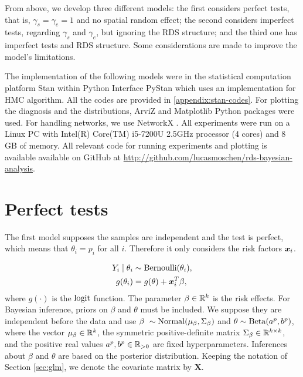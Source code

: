 From above, we develop three different models: the first considers perfect
tests, that is, $\gamma_s = \gamma_e = 1$ and no spatial random effect;
the second considers imperfect tests, regarding $\gamma_s$ and $\gamma_e$,
but ignoring the RDS structure; and the third one has imperfect tests and
RDS structure. Some considerations are made to improve the model's
  limitations.

The implementation of the following models were in the statistical computation
platform Stan \cite{carpenter2017stan} within Python Interface PyStan
\cite{pystan} which uses an implementation for HMC algorithm. All the codes
are provided in \autoref{appendix:stan-codes}. For plotting the diagnosis and
the distributions, ArviZ \cite{arviz_2019} and Matplotlib \cite{Hunter_2007}
Python packages were used. For handling networks, we use NetworkX
\cite{hagberg2008exploring}. All experiments were run on a Linux
PC with Intel(R) Core(TM) i5-7200U 2.5GHz processor (4 cores) and 8 GB of
memory. All relevant code for running experiments and plotting is available
available on GitHub at \url{http://github.com/lucasmoschen/rds-bayesian-analysis}.

\section{Perfect tests}

The first model supposes the samples are independent and the test is perfect,
which means that $\theta_i = p_i$ for all $i$. Therefore it only considers the risk factors $\boldsymbol{x}_i$.

\begin{equation}
  \label{model:perfect-tests}
  \begin{aligned}
    Y_i \mid \theta_i & \sim \operatorname{Bernoulli}(\theta_i),      \\
    g(\theta_i)       & = g(\theta) + \boldsymbol{x}_i^T\beta,
  \end{aligned}
\end{equation}
where $g(\cdot)$ is the $\operatorname{logit}$ function.
The parameter $\beta \in \mathbb{R}^{k}$ is the risk effects. For Bayesian inference, priors on
$\beta$ and $\theta$ must be included. We suppose they are independent before
the data and use $\beta ~ \sim \operatorname{Normal}(\mu_{\beta}, \Sigma_{\beta})$
and $\theta \sim \operatorname{Beta}(a^{p}, b^p)$, where the vector $\mu_{\beta}
\in \mathbb{R}^{k}$, the symmetric positive-definite matrix $\Sigma_{\beta} \in
\mathbb{R}^{k\times k}$, and the positive real values $a^p, b^p \in \mathbb{R}_{>0}$ are fixed
hyperparameters. Inferences about $\beta$ and $\theta$ are based on the
posterior distribution. Keeping the notation of
Section \ref{sec:glm}, we denote the covariate matrix by $\boldsymbol{X}$.

